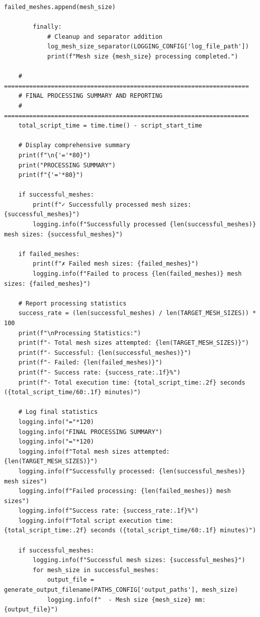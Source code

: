 \documentclass{book}
\begin{document}
\begin{itemize}[leftmargin=*,label=\textbullet]
\begin{itemize}
\begin{lstlisting}[caption={Phase 1 Meshing Automation Script},label={lst:phase1}]
            failed_meshes.append(mesh_size)
            
        finally:
            # Cleanup and separator addition
            log_mesh_size_separator(LOGGING_CONFIG['log_file_path'])
            print(f"Mesh size {mesh_size} processing completed.")
    
    # ====================================================================
    # FINAL PROCESSING SUMMARY AND REPORTING
    # ====================================================================
    total_script_time = time.time() - script_start_time
    
    # Display comprehensive summary
    print(f"\n{'='*80}")
    print("PROCESSING SUMMARY")
    print(f"{'='*80}")
    
    if successful_meshes:
        print(f"✓ Successfully processed mesh sizes: {successful_meshes}")
        logging.info(f"Successfully processed {len(successful_meshes)} mesh sizes: {successful_meshes}")
    
    if failed_meshes:
        print(f"✗ Failed mesh sizes: {failed_meshes}")
        logging.info(f"Failed to process {len(failed_meshes)} mesh sizes: {failed_meshes}")
    
    # Report processing statistics
    success_rate = (len(successful_meshes) / len(TARGET_MESH_SIZES)) * 100
    print(f"\nProcessing Statistics:")
    print(f"- Total mesh sizes attempted: {len(TARGET_MESH_SIZES)}")
    print(f"- Successful: {len(successful_meshes)}")
    print(f"- Failed: {len(failed_meshes)}")
    print(f"- Success rate: {success_rate:.1f}%")
    print(f"- Total execution time: {total_script_time:.2f} seconds ({total_script_time/60:.1f} minutes)")
    
    # Log final statistics
    logging.info("="*120)
    logging.info("FINAL PROCESSING SUMMARY")
    logging.info("="*120)
    logging.info(f"Total mesh sizes attempted: {len(TARGET_MESH_SIZES)}")
    logging.info(f"Successfully processed: {len(successful_meshes)} mesh sizes")
    logging.info(f"Failed processing: {len(failed_meshes)} mesh sizes")
    logging.info(f"Success rate: {success_rate:.1f}%")
    logging.info(f"Total script execution time: {total_script_time:.2f} seconds ({total_script_time/60:.1f} minutes)")
    
    if successful_meshes:
        logging.info(f"Successful mesh sizes: {successful_meshes}")
        for mesh_size in successful_meshes:
            output_file = generate_output_filename(PATHS_CONFIG['output_paths'], mesh_size)
            logging.info(f"  - Mesh size {mesh_size} mm: {output_file}")
    

\end{lstlisting}
\end{itemize}
\end{itemize}
\end{document}
